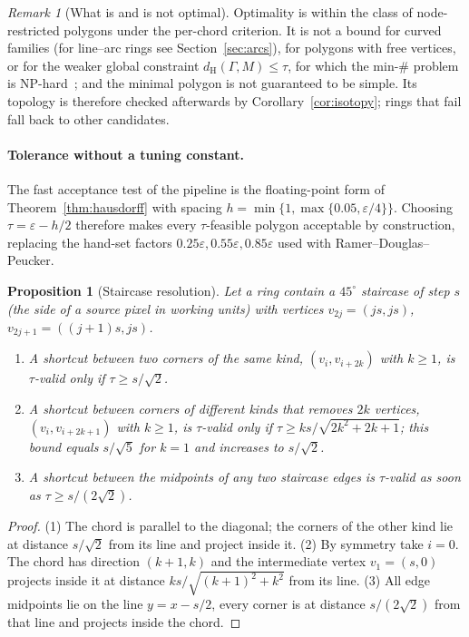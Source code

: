 \documentclass[11pt,a4paper]{article}
\newtheorem{proposition}[theorem]{Proposition}
\theoremstyle{definition}
\theoremstyle{remark}
\newtheorem{remark}[theorem]{Remark}
\newcommand{\dH}{d_{\mathrm{H}}}
\begin{document}
\begin{remark}[What is and is not optimal]
Optimality is within the class of node-restricted polygons under the
per-chord criterion. It is not a bound for curved families (for line--arc
rings see Section~\ref{sec:arcs}), for polygons with
free vertices, or for the weaker global constraint $\dH(\Gamma,M)\le\tau$,
for which the min-\# problem is NP-hard~\cite{vankreveld2018}; and
the minimal polygon is not guaranteed to be simple. Its topology is therefore
checked afterwards by Corollary~\ref{cor:isotopy}; rings that fail fall back
to other candidates.
\end{remark}

\paragraph{Tolerance without a tuning constant.} The fast acceptance test of
the pipeline is the floating-point form of Theorem~\ref{thm:hausdorff} with
spacing $h=\min\{1,\max\{0.05,\varepsilon/4\}\}$. Choosing
$\tau=\varepsilon-h/2$ therefore makes every $\tau$-feasible polygon
acceptable by construction, replacing the hand-set factors
$0.25\varepsilon,0.55\varepsilon,0.85\varepsilon$ used with
Ramer--Douglas--Peucker.

\begin{proposition}[Staircase resolution]\label{prop:staircase}
Let a ring contain a $45^\circ$ staircase of step $s$ (the side of a source
pixel in working units) with vertices $v_{2j}=(js,js)$,
$v_{2j+1}=((j+1)s,js)$.
\begin{enumerate}
\item A shortcut between two corners of the same kind,
  $(v_i,v_{i+2k})$ with $k\ge1$, is $\tau$-valid only if $\tau\ge s/\sqrt2$.
\item A shortcut between corners of different kinds that removes $2k$
  vertices, $(v_i,v_{i+2k+1})$ with $k\ge1$, is $\tau$-valid only if
  $\tau\ge ks/\sqrt{2k^2+2k+1}$; this bound equals $s/\sqrt5$ for $k=1$ and
  increases to $s/\sqrt2$.
\item A shortcut between the midpoints of any two staircase edges is
  $\tau$-valid as soon as $\tau\ge s/(2\sqrt2)$.
\end{enumerate}
\end{proposition}
\begin{proof}
(1) The chord is parallel to the diagonal; the corners of the other kind lie
at distance $s/\sqrt2$ from its line and project inside it. (2) By symmetry
take $i=0$. The chord has direction $(k+1,k)$ and the intermediate vertex
$v_1=(s,0)$ projects inside it at distance
$ks/\sqrt{(k+1)^2+k^2}$ from its line. (3) All edge midpoints lie on the line
$y=x-s/2$, every corner is at distance $s/(2\sqrt2)$ from that line and
projects inside the chord.
\end{proof}
\end{document}
